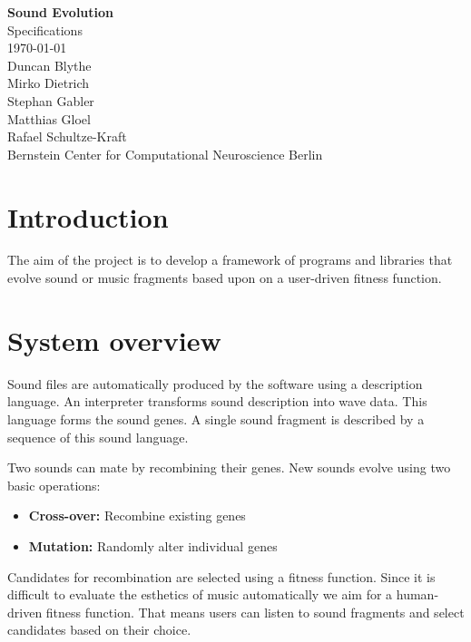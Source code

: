 \documentclass[a4paper,12pt,oneside]{article}
\begin{document}
\begin{titlepage}
  \begin{center}
    {\huge\bf Sound Evolution} \\
    \Large
    Specifications \\
    \vfill
    \normalsize
    \today \\
    \vspace{5em}
    Duncan Blythe \\
    Mirko Dietrich \\
    Stephan Gabler \\
    Matthias Gloel \\
    Rafael Schultze-Kraft \\
    \vspace{2em}
    Bernstein Center for Computational Neuroscience Berlin
  \end{center}
\end{titlepage}

\tableofcontents

\newpage

\section{Introduction}

The aim of the project is to develop a framework of programs and
libraries that evolve sound or music fragments based upon on a
user-driven fitness function.

\section{System overview}

Sound files are automatically produced by the software using a
description language. An interpreter transforms sound description into
wave data. This language forms the sound genes. A single sound
fragment is described by a sequence of this sound language.

Two sounds can mate by recombining their genes. New sounds evolve
using two basic operations:

\begin{itemize}
\item \textbf{Cross-over:} Recombine existing genes
\item \textbf{Mutation:} Randomly alter individual genes
\end{itemize}

Candidates for recombination are selected using a fitness
function. Since it is difficult to evaluate the esthetics of music
automatically we aim for a human-driven fitness function. That means
users can listen to sound fragments and select candidates based on
their choice.
\end{document}

